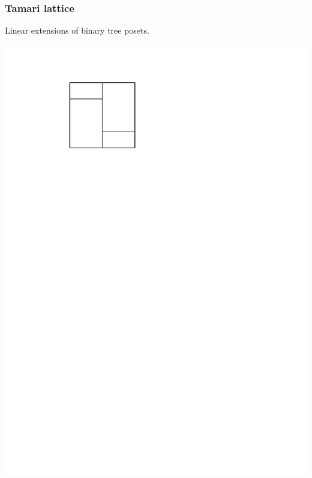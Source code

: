 \documentclass[11pt]{beamer}%
\begin{document}
\begin{frame}
  \frametitle{Tamari lattice}
  Linear extensions of binary tree posets.
  \begin{center}
    \includegraphics[page=5, height=.2\textheight]{figures.pdf}
  \end{center}
  \pause
  

\end{frame}
\end{document}
